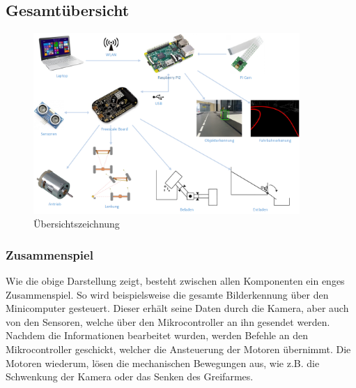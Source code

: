 \subsection{Gesamtübersicht}
\begin{figure}[H]%
\centering
\includegraphics[width=0.9\textwidth]{03_Loesungskonzept/pictures/uebersichtszeichnung.png}
\caption{Übersichtszeichnung}
\label{fig:Übersichtszeichnung}
\end{figure}
\subsubsection{Zusammenspiel}
Wie die obige Darstellung zeigt, besteht zwischen allen Komponenten ein enges Zusammenspiel. So wird beispielsweise die gesamte Bilderkennung über den Minicomputer gesteuert. Dieser erhält seine Daten durch die Kamera, aber auch von den Sensoren, welche über den Mikrocontroller an ihn gesendet werden. Nachdem die Informationen bearbeitet wurden, werden Befehle an den Mikrocontroller geschickt, welcher die Ansteuerung der Motoren übernimmt. Die Motoren wiederum, lösen die mechanischen Bewegungen aus, wie z.B. die Schwenkung der Kamera oder das Senken des Greifarmes.
